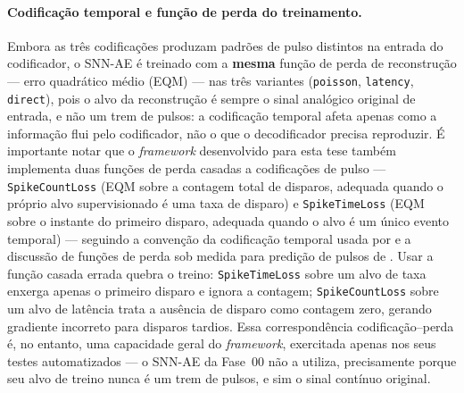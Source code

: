 \paragraph{Codificação temporal e função de perda do treinamento.} Embora as três codificações produzam padrões de pulso distintos na entrada do codificador, o SNN-AE é treinado com a \textbf{mesma} função de perda de reconstrução --- erro quadrático médio (EQM) --- nas três variantes (\texttt{poisson}, \texttt{latency}, \texttt{direct}), pois o alvo da reconstrução é sempre o sinal analógico original de entrada, e não um trem de pulsos: a codificação temporal afeta apenas como a informação flui pelo codificador, não o que o decodificador precisa reproduzir. É importante notar que o \textit{framework} desenvolvido para esta tese também implementa duas funções de perda casadas a codificações de pulso --- \texttt{SpikeCountLoss} (EQM sobre a contagem total de disparos, adequada quando o próprio alvo supervisionado é uma taxa de disparo) e \texttt{SpikeTimeLoss} (EQM sobre o instante do primeiro disparo, adequada quando o alvo é um único evento temporal) --- seguindo a convenção da codificação temporal usada por  e a discussão de funções de perda sob medida para predição de pulsos de . Usar a função casada errada quebra o treino: \texttt{SpikeTimeLoss} sobre um alvo de taxa enxerga apenas o primeiro disparo e ignora a contagem; \texttt{SpikeCountLoss} sobre um alvo de latência trata a ausência de disparo como contagem zero, gerando gradiente incorreto para disparos tardios. Essa correspondência codificação--perda é, no entanto, uma capacidade geral do \textit{framework}, exercitada apenas nos seus testes automatizados --- o SNN-AE da Fase~00 não a utiliza, precisamente porque seu alvo de treino nunca é um trem de pulsos, e sim o sinal contínuo original.

